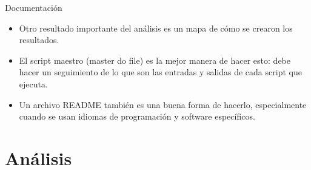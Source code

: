 \documentclass[10pt, aspectratio=169, compress]{beamer}
\begin{document}
\begin{frame}[t]{Documentación}
	\begin{itemize}
		\item Otro resultado importante del análisis es un mapa de cómo se crearon los resultados.
		\item El script maestro (master do file) es la mejor manera de hacer esto: debe hacer un seguimiento de lo que son las entradas y salidas de cada script que ejecuta.
		\item Un archivo README también es una buena forma de hacerlo, especialmente cuando se usan idiomas de programación y software específicos.
	\end{itemize}
\end{frame}
\section{Análisis}
\end{document}
